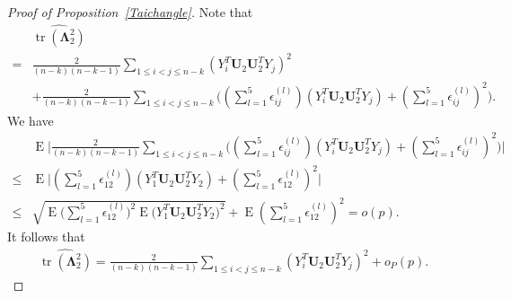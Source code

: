 \documentclass[12pt]{article} %
\DeclareMathOperator{\mytr}{tr}
\DeclareMathOperator{\myE}{E}
\newcommand{\bU}{\mathbf{U}}
\newcommand{\bfsym}[1]{\ensuremath{\boldsymbol{#1}}}
\def\bLambda {\bfsym {\Lambda}}
\theoremstyle{definition}
\begin{document}
\begin{proof}[Proof of Proposition~\ref{Taichangle}]
        Note that
    $$
        \begin{aligned}
            &\widehat{\mytr(\bLambda_2^2)}\\
            =&
        \frac{2}{(n-k)(n-k-1)}\sum_{1\leq i<j\leq n-k}(Y_i^T \bU_2 \bU_2^T Y_j)^2 \\
            &+
            \frac{2}{(n-k)(n-k-1)}\sum_{1\leq i<j\leq n-k}\big((\sum_{l=1}^5\epsilon_{ij}^{(l)})(Y_i^T \bU_2 \bU_2^T Y_j)
            + (\sum_{l=1}^5\epsilon_{ij}^{(l)})^2\big).
        \end{aligned}
    $$
        We have
        $$
            \begin{aligned}
                &\myE\Big|\frac{2}{(n-k)(n-k-1)}\sum_{1\leq i<j\leq n-k}\big((\sum_{l=1}^5\epsilon_{ij}^{(l)})(Y_i^T \bU_2 \bU_2^T Y_j)
                +
                (\sum_{l=1}^5\epsilon_{ij}^{(l)})^2\big)\Big|\\
                \leq&
                \myE\Big|(\sum_{l=1}^5\epsilon_{12}^{(l)})(Y_1^T \bU_2 \bU_2^T Y_2)
            +
            (\sum_{l=1}^5\epsilon_{12}^{(l)})^2\Big|\\
            \leq&
            \sqrt{\myE\big(\sum_{l=1}^5\epsilon_{12}^{(l)}\big)^2\myE\big(Y_1^T \bU_2 \bU_2^T Y_2\big)^2}
            +
            \myE (\sum_{l=1}^5\epsilon_{12}^{(l)})^2=o(p).
        \end{aligned}
    $$
    It follows that
$$
    \begin{aligned}
        \widehat{\mytr(\bLambda_2^2)}
        =
    \frac{2}{(n-k)(n-k-1)}\sum_{1\leq i<j\leq n-k}(Y_i^T \bU_2 \bU_2^T Y_j)^2 
        +o_P(p).
    \end{aligned}
$$


\end{proof}
\end{document}

